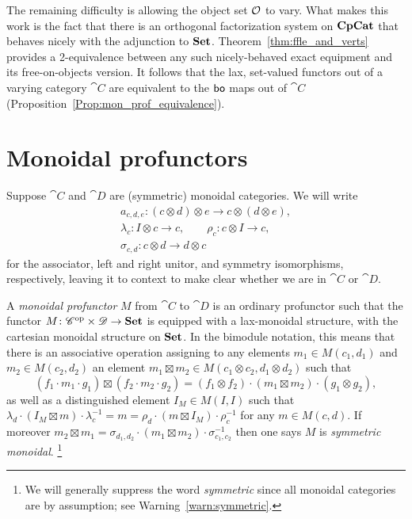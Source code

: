 \documentclass[12pt,oneside,article,draft]{memoir}
\begin{document}
The remaining difficulty is allowing the object set $\mathcal{O}$ to vary. What makes this work is the
fact that there is an orthogonal factorization system on $\mathbf{CpCat}$ that behaves nicely with the
adjunction to $\mathbf{Set}$. Theorem~\ref{thm:ffle_and_verts} provides a 2-equivalence between any such
nicely-behaved exact equipment and its free-on-objects version. It follows that the lax, set-valued
functors out of a varying category $\cat{C}$ are equivalent to the $\mathsf{bo}$ maps out of $\cat{C}$
(Proposition~\ref{Prop:mon_prof_equivalence}). 


\section{Monoidal profunctors}\label{sec:monoidal_profunctors}

Suppose $\cat{C}$ and $\cat{D}$ are (symmetric) monoidal categories. We will write
\begin{gather*}
   a_{c,d,e}\colon (c\otimes d)\otimes e \to c\otimes(d\otimes e), \\
      \lambda_c\colon I\otimes c\to c,
      \qquad \rho_c\colon c\otimes I \to c, \\
      \sigma_{c,d}\colon c\otimes d\to d\otimes c
\end{gather*}
for the associator, left and right unitor, and symmetry isomorphisms, respectively, leaving it to
context to make clear whether we are in $\cat{C}$ or $\cat{D}$.

A \emph{monoidal profunctor} $M$ from $\cat{C}$ to $\cat{D}$ is an ordinary profunctor such that the
functor $M\colon {\mathscr{C}}^{\text{op}}\times\mathscr{D}\to\mathbf{Set}$ is equipped with a lax-monoidal structure, with
the cartesian monoidal structure on $\mathbf{Set}$. In the bimodule notation, this means that there is an
associative operation assigning to any elements $m_1\in M(c_1,d_1)$ and $m_2\in M(c_2,d_2)$ an
element $m_1\boxtimes m_2\in M(c_1\otimes c_2,d_1\otimes d_2)$ such that
\[
   (f_1\cdot m_1\cdot g_1)\boxtimes(f_2\cdot m_2\cdot g_2) = (f_1\otimes f_2)\cdot(m_1\boxtimes m_2)\cdot(g_1\otimes g_2),
\]
as well as a distinguished element $I_M\in M(I,I)$ such that $\lambda_d\cdot(I_M\boxtimes
m)\cdot\lambda^{-1}_c = m = \rho_d\cdot(m\boxtimes I_M)\cdot\rho^{-1}_c$ for any $m\in M(c,d)$. If
moreover $m_2\boxtimes m_1 = \sigma_{d_1,d_2}\cdot(m_1\boxtimes m_2)\cdot\sigma_{c_1,c_2}^{-1}$ then
one says $M$ is \emph{symmetric monoidal}.%
\footnote{We will generally suppress the word \emph{symmetric} since all monoidal categories are by assumption; see Warning~\ref{warn:symmetric}.}
\end{document}
